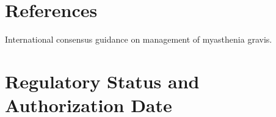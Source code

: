 \section*{References}
International consensus guidance on management of myasthenia gravis.

\clearpage


\section*{Regulatory Status and Authorization Date}

\clearpage
